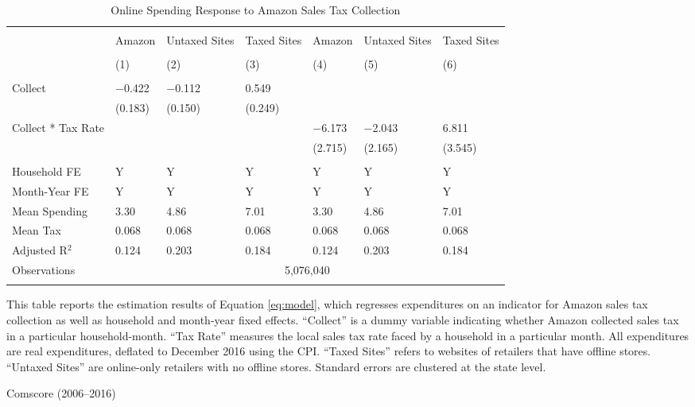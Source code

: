 
\begin{table}[!htbp] \centering
  \caption{Online Spending Response to Amazon Sales Tax Collection}
  \label{tab:spendingDiD}
\begin{tabularx}{\textwidth}{lXXXXXX}
\\[-1.8ex]\hline
\hline \\[-1.8ex]
 & Amazon & Untaxed Sites & Taxed Sites & Amazon & Untaxed Sites & Taxed Sites \\
\\[-1.8ex] & (1) & (2) & (3) & (4) & (5) & (6)\\
\hline \\[-1.8ex]
 Collect & $-$0.422 & $-$0.112 & 0.549 &  &  &  \\
  & (0.183) & (0.150) & (0.249) &  &  &  \\
  Collect * Tax Rate &  &  &  & $-$6.173 & $-$2.043 & 6.811 \\
  &  &  &  & (2.715) & (2.165) & (3.545) \\
 \hline \\[-1.8ex]
Household FE & Y & Y & Y & Y & Y & Y \\
Month-Year FE & Y & Y & Y & Y & Y & Y \\
Mean Spending & 3.30 & 4.86 & 7.01 & 3.30 & 4.86 & 7.01 \\
Mean Tax & 0.068 & 0.068 & 0.068 & 0.068 & 0.068 & 0.068 \\
Adjusted R$^{2}$ & 0.124 & 0.203 & 0.184 & 0.124 & 0.203 & 0.184 \\
Observations & \multicolumn{6}{c}{5,076,040} \\
\hline
\hline \\[-1.8ex]
\end{tabularx}
\begin{tablenotes}
This table reports the estimation results of Equation \ref{eq:model}, which regresses expenditures on an indicator for Amazon sales tax collection as well as household and month-year fixed effects. ``Collect'' is a dummy variable indicating whether Amazon collected sales tax in a particular household-month. ``Tax Rate'' measures the local sales tax rate faced by a household in a particular month. All expenditures are real expenditures, deflated to December 2016 using the CPI. ``Taxed Sites'' refers to websites of retailers that have offline stores. ``Untaxed Sites'' are online-only retailers with no offline stores. Standard errors are clustered at the state level.
\end{tablenotes}
\begin{tablenotes}[Source]
Comscore (2006--2016)
\end{tablenotes}
\end{table}
